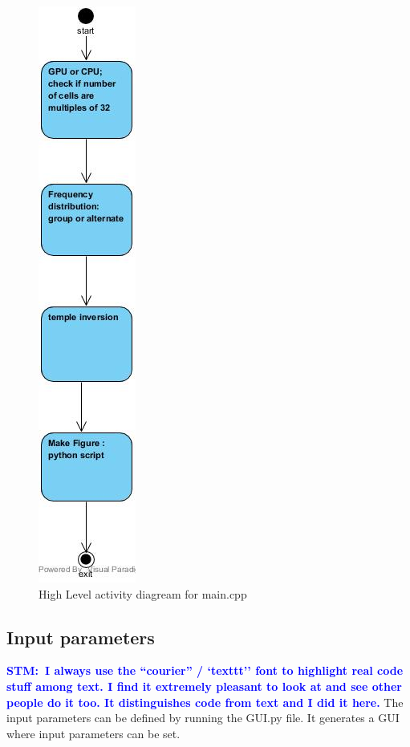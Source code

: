 \documentclass[10pt,a4paper]{article}
\newcommand{\commentstm}[1]{\textcolor{blue}{\textbf{STM:\ #1}}}
\begin{document}
\begin{figure}
\centering
 \includegraphics[scale=0.75]{main.jpg}
  \caption{High Level activity diagream for main.cpp}
  \label{fig:fig3}
\end{figure}


\subsection{Input parameters}
\commentstm{I always use the ``courier'' / `texttt'' font to highlight real code stuff among text. I find it extremely pleasant to look at and see other people do it too. It distinguishes code from text and I did it here.}
The input parameters can be defined by running the GUI.py file. It generates a GUI where input parameters can be set.
\end{document}

